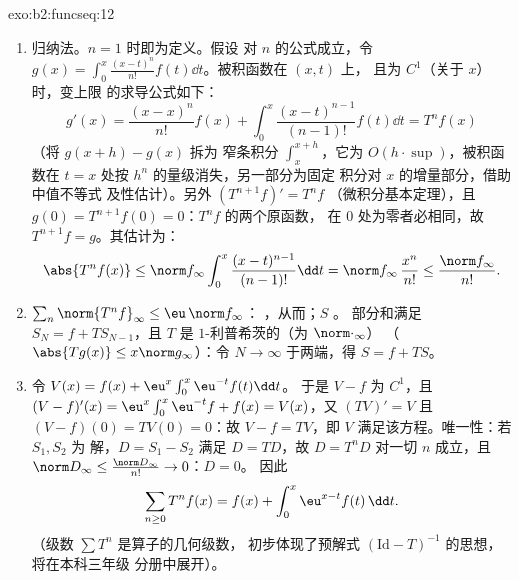 \begin{solution}{exo:b2:funcseq:12}
\begin{enumerate}
  \item 归纳法。$n = 1$ 时即为定义。假设
        对 $n$ 的公式成立，令 $g(x) = \int_0^x \frac{(x-t)^n}{n!}
        f(t)\dd t$。被积函数在 $(x,t)$ 上，
        且为 $C^1$（关于 $x$）时，变上限
        的求导公式如下：
        \[
        g'(x) = \frac{(x-x)^n}{n!}f(x)
        + \int_0^x \frac{(x-t)^{n-1}}{(n-1)!}f(t)\dd t
        = T^nf(x)
        \]
        （将 $g(x+h) - g(x)$ 拆为
        窄条积分 $\int_x^{x+h}$，它为 $O(h\cdot\sup)$，被积函数在
        $t = x$ 处按 $h^n$ 的量级消失，另一部分为固定
        积分对 $x$ 的增量部分，借助中值不等式
        及性估计）。另外 $(T^{n+1}f)' = T^nf$
        （微积分基本定理），且 $g(0) =
        T^{n+1}f(0) = 0$：$T^nf$ 的两个原函数，
        在 $0$ 处为零者必相同，故 $T^{n+1}f = g$。其估计为：
        \[
        \abs{T^nf(x)} \leq \norm f_\infty
        \int_0^x \frac{(x-t)^{n-1}}{(n-1)!}\dd t
        = \norm f_\infty\,\frac{x^n}{n!}
        \leq \frac{\norm f_\infty}{n!} .
        \]
  \item $\sum_n \norm{T^nf}_\infty \leq \eu\,\norm f_\infty$：
        ，从而；$S$ 。
        部分和满足 $S_N = f + T S_{N-1}$，且 $T$
        是 $1$-利普希茨的（为 $\norm\cdot_\infty$）
        （$\abs{Tg(x)} \leq x\norm g_\infty$）：令 $N \to
        \infty$ 于两端，得 $S = f + TS$。
  \item 令 $V(x) = f(x) + \eu^x\int_0^x \eu^{-t}f(t)\dd t$。
        于是 $V - f$ 为 $C^1$，且 $(V-f)'(x) =
        \eu^x\int_0^x\eu^{-t}f + f(x) = V(x)$，又 $(TV)' = V$
        且 $(V - f)(0) = TV(0) = 0$：故 $V - f = TV$，即
        $V$ 满足该方程。唯一性：若 $S_1, S_2$ 为
        解，$D = S_1 - S_2$ 满足 $D =
        TD$，故 $D = T^nD$ 对一切 $n$ 成立，且 $\norm D_\infty
        \leq \frac{\norm D_\infty}{n!} \to 0$：$D = 0$。
        因此
        \[
        \sum_{n\geq0} T^nf(x) = f(x) +
        \int_0^x \eu^{x-t}f(t)\,\dd t .
        \]
        （级数 $\sum T^n$ 是算子的几何级数，
        初步体现了预解式
        $(\mathrm{Id} - T)^{-1}$ 的思想，将在本科三年级
        分册中展开）。
\end{enumerate}
\end{solution}

